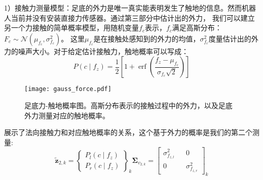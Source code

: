 1）接触力测量模型：足底的外力是唯一真实能表明发生了触地的信息。然而机器人当前并没有安装直接力传感器。通过第三部分中估计出的外力，
我们可以建立另一个力接触的简单概率模型，用随机变量$f_c$表示，$f_c$满足高斯分布：$F_c \sim \mathcal{N}\left(\mu_{f_c}, \sigma_{f_c}^2\right)$。
这里$\mu_{f_c}$是在接触处感知到的外力的均值，$\sigma_{f_c}^2$度量估计出的外力的噪声大小。对于给定估计接触力，触地概率可以写成：
\begin{equation}
    \label{equ:est_force_prob}
    P\left(c \mid f_z\right)=\frac{1}{2}\left[1+\operatorname{erf}\left(\frac{f_z-\mu_{f_c}}{\sigma_{f_c} \sqrt{2}}\right)\right]
\end{equation}
\begin{figure}[htbp]
    \centering
    \texttt{[image: gauss\_force.pdf]}
    \caption{\label{fig:gauss_force}足底力-触地概率图。高斯分布表示的接触过程中的外力，以及足底外力测量对应的触地概率。}
\end{figure}
展示了法向接触力和对应触地概率的关系，这个基于外力的概率是我们的第二个测量:
\begin{equation}
    \label{equ:est_force_noise}
    \tilde{\boldsymbol{z}}_{2, k}=\left\{\begin{array}{c}
        P_l\left(c \mid f_z\right) \\
        P_r\left(c \mid f_z\right)
        \end{array}\right\}_k \boldsymbol{\Sigma}_{v_{2, k}}=\left[\begin{array}{ccc}
        \sigma_{f_{z, l}}^2 & & 0 \\
        0 & & \sigma_{f_{z, r}}^2
        \end{array}\right]_k
\end{equation}

